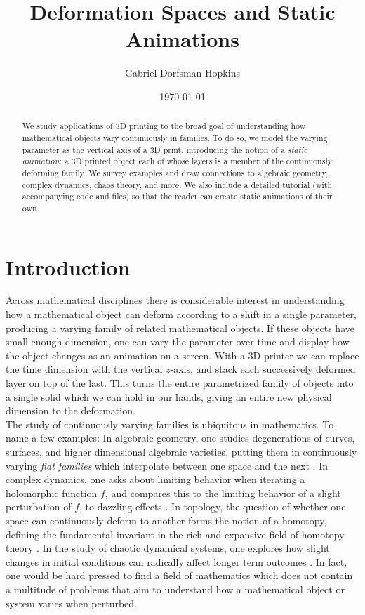 \documentclass[12 pt]{article}
\title{Deformation Spaces and Static Animations}
\author{Gabriel Dorfsman-Hopkins}
\date{\today}
\begin{document}
\maketitle

\begin{abstract}
      We study applications of 3D printing to the broad goal of understanding how mathematical objects vary continuously in families.  To do so, we model the varying parameter as the vertical axis of a 3D print, introducing the notion of a \textit{static animation}: a 3D printed object each of whose layers is a member of the continuously deforming family.  We survey examples and draw connections to algebraic geometry, complex dynamics, chaos theory, and more.  We also include a detailed tutorial (with accompanying code and files) so that the reader can create static animations of their own.
\end{abstract}

\section{Introduction}
Across mathematical disciplines there is considerable interest in understanding how a mathematical object can deform according to a shift in a single parameter, producing a varying family of related mathematical objects.  If these objects have small enough dimension, one can vary the parameter over time and display how the object changes as an animation on a screen. With a 3D printer we can replace the time dimension with the vertical $z$-axis, and stack each successively deformed layer on top of the last. This turns the entire parametrized family of objects into a single solid which we can hold in our hands, giving an entire new physical dimension to the deformation.\\

The study of continuously varying families is ubiquitous in mathematics.  To name a few examples:  In algebraic geometry, one studies degenerations of curves, surfaces, and higher dimensional algebraic varieties, putting them in continuously varying \textit{flat families} which interpolate between one space and the next \cite[Chapter III.9]{Hartshorne}.  In complex dynamics, one asks about limiting behavior when iterating a holomorphic function $f$, and compares this to the limiting behavior of a slight perturbation of $f$, to dazzling effects \cite{Milnor}.  In topology, the question of whether one space can continuously deform to another forms the notion of a homotopy, defining the fundamental invariant in the rich and expansive field of homotopy theory \cite[Chapter 4]{Hatcher}.  In the study of chaotic dynamical systems, one explores how slight changes in initial conditions can radically affect longer term outcomes \cite{strogatz}.  In fact, one would be hard pressed to find a field of mathematics which does not contain a multitude of problems that aim to understand how a mathematical object or system varies when perturbed.\\
\end{document}
